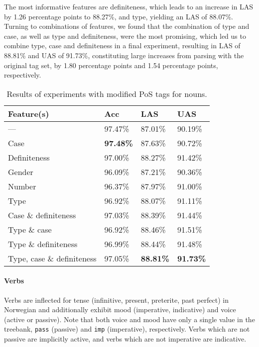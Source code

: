 \documentclass[11pt,a4paper]{article}
\begin{document}
The most informative features are definiteness, which
leads to an increase in LAS by 1.26 percentage points to 88.27\%, and type,
yielding an LAS of 88.07\%. Turning to combinations of features, we found that
the combination of type and case, as well as type and definiteness, were the
most promising, which led us to combine type, case and definiteness in a final
experiment, resulting in LAS of 88.81\% and UAS of 91.73\%, constituting large
increases from parsing with the original tag set, by 1.80 percentage points
and 1.54 percentage points, respectively.

\begin{table}
    \centering
    \smaller[1]
    \begin{tabular}{@{}llll@{}}
        \toprule
        \textbf{Feature(s)} & \textbf{Acc} & \textbf{LAS} & \textbf{UAS}
        \\
        \midrule
        --- & 97.47\% & 87.01\% & 90.19\% \\
        Case & \textbf{97.48\%} & 87.63\% & 90.72\% \\
        Definiteness & 97.00\% & 88.27\% & 91.42\% \\
        Gender & 96.09\% & 87.21\% & 90.36\% \\
        Number & 96.37\% & 87.97\% & 91.00\% \\
        Type & 96.92\% & 88.07\% & 91.11\% \\
        Case \& definiteness & 97.03\% & 88.39\% & 91.44\% \\
        Type \& case & 96.92\% & 88.46\% & 91.51\% \\
        Type \& definiteness & 96.99\% & 88.44\% & 91.48\% \\
        Type, case \& definiteness & 97.05\% & \textbf{88.81\%} &
        \textbf{91.73\%} \\
        \bottomrule
    \end{tabular}
    \caption{Results of experiments with modified PoS tags for nouns.}
    \label{substresults}
\end{table}

\paragraph{Verbs}
Verbs are inflected for tense (infinitive, present, preterite, past perfect) in
Norwegian and additionally exhibit mood (imperative, indicative) and voice
(active or passive). Note that both voice and mood have only a single value in
the treebank, \texttt{pass} (passive) and \texttt{imp} (imperative),
respectively.  Verbs which are not passive are implicitly active, and verbs
which are not imperative are indicative.
\end{document}
